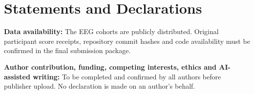 \documentclass[11pt,a4paper]{article}
\begin{document}
\section*{Statements and Declarations}
\textbf{Data availability:} The EEG cohorts are publicly distributed.
Original participant score receipts, repository commit hashes and code
availability must be confirmed in the final submission package.

\textbf{Author contribution, funding, competing interests, ethics and
AI-assisted writing:} To be completed and confirmed by all authors before
publisher upload. No declaration is made on an author's behalf.



\end{document}

